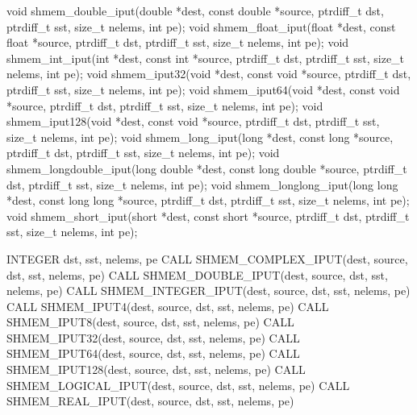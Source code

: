 
\begin{apidefinition}

\begin{Csynopsis}
void shmem_double_iput(double *dest, const double *source, ptrdiff_t dst, ptrdiff_t sst, size_t nelems, int pe);
void shmem_float_iput(float *dest, const float *source, ptrdiff_t dst, ptrdiff_t sst, size_t nelems, int pe);
void shmem_int_iput(int *dest, const int *source, ptrdiff_t dst, ptrdiff_t sst, size_t nelems, int pe);
void shmem_iput32(void *dest, const void *source, ptrdiff_t dst, ptrdiff_t sst, size_t nelems, int pe);
void shmem_iput64(void *dest, const void *source, ptrdiff_t dst, ptrdiff_t sst, size_t nelems, int pe);
void shmem_iput128(void *dest, const void *source, ptrdiff_t dst, ptrdiff_t sst, size_t nelems, int pe);
void shmem_long_iput(long *dest, const long *source, ptrdiff_t dst, ptrdiff_t sst, size_t nelems, int pe);
void shmem_longdouble_iput(long double *dest, const long double *source, ptrdiff_t dst, ptrdiff_t sst, size_t nelems, int pe);
void shmem_longlong_iput(long long *dest, const long long *source, ptrdiff_t dst, ptrdiff_t sst, size_t nelems, int pe);
void shmem_short_iput(short *dest, const short *source, ptrdiff_t dst, ptrdiff_t sst, size_t nelems, int pe);
\end{Csynopsis}

\begin{Fsynopsis}
INTEGER dst, sst, nelems, pe
CALL SHMEM_COMPLEX_IPUT(dest, source, dst, sst, nelems, pe)
CALL SHMEM_DOUBLE_IPUT(dest, source, dst, sst, nelems, pe)
CALL SHMEM_INTEGER_IPUT(dest, source, dst, sst, nelems, pe)
CALL SHMEM_IPUT4(dest, source, dst, sst, nelems, pe)
CALL SHMEM_IPUT8(dest, source, dst, sst, nelems, pe)
CALL SHMEM_IPUT32(dest, source, dst, sst, nelems, pe)
CALL SHMEM_IPUT64(dest, source, dst, sst, nelems, pe)
CALL SHMEM_IPUT128(dest, source, dst, sst, nelems, pe)
CALL SHMEM_LOGICAL_IPUT(dest, source, dst, sst, nelems, pe)
CALL SHMEM_REAL_IPUT(dest, source, dst, sst, nelems, pe)
\end{Fsynopsis}


\end{apidefinition}
